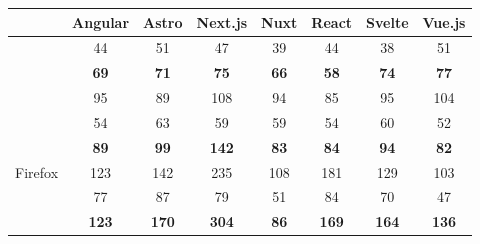 \documentclass[a4paper, 12pt]{article}
\begin{document}
\begin{table}[h!]
  {\footnotesize
  \centering
  \begin{adjustbox}{angle=0}
    {
      \begin{tabular}{|l|c|c|c|c|c|c|c|}
        \hline
        ~                                            & \textbf{Angular} & \textbf{Astro}                  & \textbf{Next.js}                & \textbf{Nuxt}          & \textbf{React}  & \textbf{Svelte} & \textbf{Vue.js} \\ \hline
\rowcolor{white}                                     & 44               & 51                              & 47                              & 39                     & 44              & 38              & 51              \\
\rowcolor{white}                                     & \textbf{69}      & \textbf{71}                     & \textbf{75}                     & \textbf{66}            & \textbf{58}     & \textbf{74}     & \textbf{77}     \\
\rowcolor{white} \multirow{-3}{*}{Chromium}          & 95               & 89                              & 108                             & 94                     & 85              & 95              & 104             \\ \hline
                                                     & 54               & 63                              & 59                              & 59                     & 54              & 60              & 52              \\
                                                     & \textbf{89}      & \textbf{99}                     & \textbf{142}                    & \textbf{83}            & \textbf{84}     & \textbf{94}     & \textbf{82}     \\
                 \multirow{-3}{*}{Firefox}           & 123              & 142                             & 235                             & 108                    & 181             & 129             & 103             \\ \hline
\rowcolor{white}                                     & 77               & \cellcolor{red!50}87            & 79                              & 51                     & 84              & 70              & 47              \\
\rowcolor{white}                                     & \textbf{123}     & \textbf{170}                    & \cellcolor{red!50}\textbf{304}  & \textbf{86}            & \textbf{169}    & \textbf{164}    & \textbf{136}    \\

\end{tabular}}
\end{adjustbox}}
\end{table}
\end{document}
